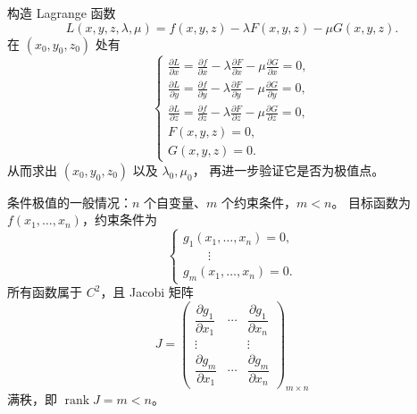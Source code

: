 \begin{proposition}
	构造 Lagrange 函数
\[
L(x,y,z,\lambda,\mu)
=f(x,y,z)-\lambda F(x,y,z)-\mu G(x,y,z).
\]
在 $(x_0,y_0,z_0)$ 处有
\[
\begin{cases}
\displaystyle\frac{\partial L}{\partial x}
=\frac{\partial f}{\partial x}
-\lambda\frac{\partial F}{\partial x}
-\mu\frac{\partial G}{\partial x}=0,\\[6pt]
\displaystyle\frac{\partial L}{\partial y}
=\frac{\partial f}{\partial y}
-\lambda\frac{\partial F}{\partial y}
-\mu\frac{\partial G}{\partial y}=0,\\[6pt]
\displaystyle\frac{\partial L}{\partial z}
=\frac{\partial f}{\partial z}
-\lambda\frac{\partial F}{\partial z}
-\mu\frac{\partial G}{\partial z}=0,\\[6pt]
F(x,y,z)=0,\\
G(x,y,z)=0.
\end{cases}
\]
从而求出 $(x_0,y_0,z_0)$ 以及 $\lambda_0,\mu_0$，
再进一步验证它是否为极值点。
\end{proposition}

条件极值的一般情况：$n$ 个自变量、$m$ 个约束条件，$m<n$。
目标函数为 $f(x_1,\ldots,x_n)$，约束条件为
\[
\begin{cases}
g_1(x_1,\ldots,x_n)=0,\\
\qquad\vdots\\
g_m(x_1,\ldots,x_n)=0.
\end{cases}\tag{*}
\]
所有函数属于 $C^2$，且 Jacobi 矩阵
\[
J=
\begin{pmatrix}
\dfrac{\partial g_1}{\partial x_1}&\cdots&
\dfrac{\partial g_1}{\partial x_n}\\
\vdots&&\vdots\\
\dfrac{\partial g_m}{\partial x_1}&\cdots&
\dfrac{\partial g_m}{\partial x_n}
\end{pmatrix}_{m\times n}
\]
满秩，即 $\operatorname{rank}J=m<n$。

